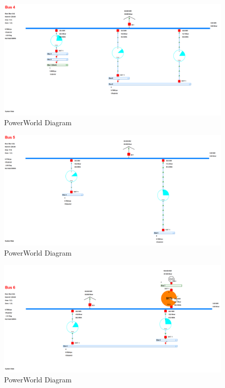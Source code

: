 \documentclass[12pt]{article}
\begin{document}
        \begin{figure}[H]
            \centerline{\includegraphics[scale=0.25]{images/PowerWorldBus4}}
            \caption{PowerWorld Diagram}
        \end{figure}

        \begin{figure}[H]
            \centerline{\includegraphics[scale=0.25]{images/PowerWorldBus5}}
            \caption{PowerWorld Diagram}
        \end{figure}

        \begin{figure}[H]
            \centerline{\includegraphics[scale=0.25]{images/PowerWorldBus6}}
            \caption{PowerWorld Diagram}
        \end{figure}
\end{document}
